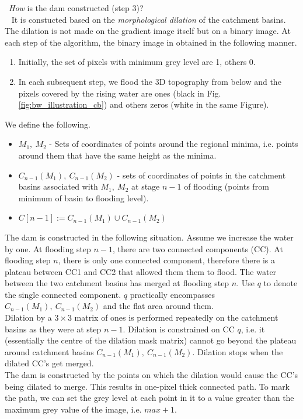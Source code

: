 \documentclass[a4paper]{article}
\begin{document}
 
 \faQuestionCircle \ \textit{How} is the dam constructed (step 3)?\\
 \faCheckCircle \ 
It is constucted based on the \textit{morphological dilation} of the catchment basins. The dilation is not made on the gradient image itself but on a binary image. At each step of the algorithm, the binary
image in obtained in the following
manner.
\begin{enumerate}
    \item Initially, the set of pixels with minimum grey level are 1, others 0.
    \item In each subsequent step, we flood the 3D
topography from below and the pixels
covered by the rising water are ones (black in Fig. \ref{fig:bw_illustration_cb}) and
others zeros (white in the same Figure).
\end{enumerate}
We define the following.
\begin{itemize}
    \item $M_1, \ M_2$ - Sets of coordinates of points around the regional minima, i.e. points around them that have the same height as the minima.
    \item $C_{n-1}(M_1), \ C_{n-1}(M_2)$ - sets of coordinates of points in the catchment basins associated with $M_1,\ M_2$ at stage $n-1$ of flooding (points from minimum of basin to flooding level).
    \item $C[n-1]:=C_{n-1}(M_1) \cup C_{n-1}(M_2)$
\end{itemize}
 The dam is constructed in the following situation. Assume we increase the water by one. At flooding step  $n-1$, there are two connected components (CC). At
flooding step $n$, there is only one connected component, therefore there is a plateau between CC1 and CC2 that allowed them them to flood. The water between the two catchment basins has merged at flooding step $n$. Use $q$ to denote the single connected component. $q$ practically encompasses $C_{n-1}(M_1),\ C_{n-1}(M_2)$ and the flat area around them. \\
Dilation by a $3\times 3$ matrix of ones is performed repeatedly on the catchment basins as they were at step $n-1$. Dilation is constrained on CC $q$, i.e. it (essentially the centre of the dilation mask matrix) cannot go beyond the plateau around catchment basins $C_{n-1}(M_1),\ C_{n-1}(M_2)$. Dilation stops when the dilated CC's get merged.\\
The dam is constructed by
the points on which the
dilation would cause the
CC's being dilated to merge. This results in one-pixel thick
connected path. To mark the path, we can set the grey level at
each point in it to a value greater than
the maximum grey value of
the image, i.e. $max+1$.
 
\end{document}
